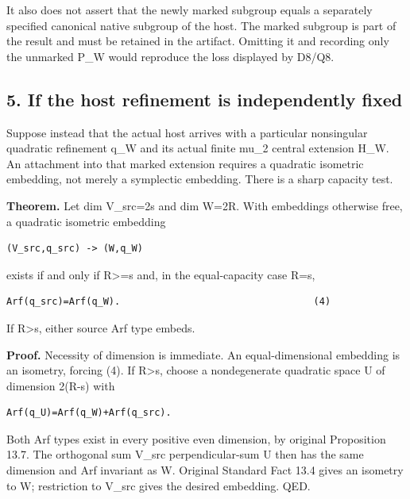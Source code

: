 It also does not assert that the newly marked subgroup equals a
separately specified canonical native subgroup of the host. The marked
subgroup is part of the result and must be retained in the artifact.
Omitting it and recording only the unmarked P\_W would reproduce the
loss displayed by D8/Q8.

\hypertarget{dyadic_markings-if-the-host-refinement-is-independently-fixed}{%
\subsection{5. If the host refinement is independently
fixed}\label{dyadic_markings-if-the-host-refinement-is-independently-fixed}}

Suppose instead that the actual host arrives with a particular
nonsingular quadratic refinement q\_W and its actual finite mu\_2
central extension H\_W. An attachment into that marked extension
requires a quadratic isometric embedding, not merely a symplectic
embedding. There is a sharp capacity test.

\textbf{Theorem.} Let dim V\_src=2s and dim W=2R. With embeddings
otherwise free, a quadratic isometric embedding

\begin{Verbatim}[fontsize=\small,breaklines=true,breakanywhere=true]
(V_src,q_src) -> (W,q_W)
\end{Verbatim}

exists if and only if R\textgreater=s and, in the equal-capacity case
R=s,

\begin{Verbatim}[fontsize=\small,breaklines=true,breakanywhere=true]
Arf(q_src)=Arf(q_W).                                  (4)
\end{Verbatim}

If R\textgreater s, either source Arf type embeds.

\textbf{Proof.} Necessity of dimension is immediate. An
equal-dimensional embedding is an isometry, forcing (4). If
R\textgreater s, choose a nondegenerate quadratic space U of
dimension 2(R-s) with

\begin{Verbatim}[fontsize=\small,breaklines=true,breakanywhere=true]
Arf(q_U)=Arf(q_W)+Arf(q_src).
\end{Verbatim}

Both Arf types exist in every positive even dimension, by original
Proposition 13.7. The orthogonal sum V\_src perpendicular-sum U then has
the same dimension and Arf invariant as W. Original Standard Fact 13.4
gives an isometry to W; restriction to V\_src gives the desired
embedding. QED.

